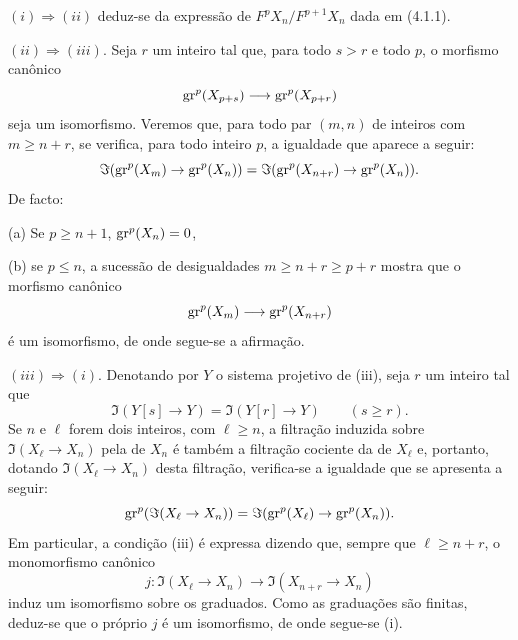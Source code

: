 \begin{prooftext}[Demonstração]
$(i)\Rightarrow(ii)$ deduz-se da expressão de $F^pX_n/F^{p+1}X_n$ dada em (4.1.1).

$(ii)\Rightarrow(iii)$. Seja $r$ um inteiro tal que, para todo $s>r$ e todo $p$, o morfismo canônico
\[
\operatorname{gr}^p(X_{p+s})\longrightarrow \operatorname{gr}^p(X_{p+r})
\]
seja um isomorfismo. Veremos que, para todo par $(m,n)$ de inteiros com $m\ge n+r$, se verifica, para todo inteiro $p$, a igualdade que aparece a seguir:
\[
\Im(\operatorname{gr}^p(X_m)\to\operatorname{gr}^p(X_n))=
\Im(\operatorname{gr}^p(X_{n+r})\to\operatorname{gr}^p(X_n)).
\]
De facto:

(a) Se $p\ge n+1$, $\operatorname{gr}^p(X_n)=0$,

(b) se $p\le n$, a sucessão de desigualdades $m\ge n+r\ge p+r$ mostra que o morfismo canônico
\[
\operatorname{gr}^p(X_m)\longrightarrow\operatorname{gr}^p(X_{n+r})
\]
é um isomorfismo, de onde segue-se a afirmação.

$(iii)\Rightarrow(i)$. Denotando por $Y$ o sistema projetivo de (iii), seja $r$ um inteiro tal que
\[
\Im(Y[s]\to Y)=\Im(Y[r]\to Y)\qquad(s\ge r).
\]
Se $n$ e $\ell$ forem dois inteiros, com $\ell\ge n$, a filtração induzida sobre $\Im(X_\ell\to X_n)$ pela de $X_n$ é também a filtração cociente da de $X_\ell$ e, portanto, dotando $\Im(X_\ell\to X_n)$ desta filtração, verifica-se a igualdade que se apresenta a seguir:
\[
\operatorname{gr}^p(\Im(X_\ell\to X_n))=
\Im(\operatorname{gr}^p(X_\ell)\to\operatorname{gr}^p(X_n)).
\]
Em particular, a condição (iii) é expressa dizendo que, sempre que $\ell\ge n+r$, o monomorfismo canônico
\[
j:\Im(X_\ell\to X_n)\longrightarrow\Im(X_{n+r}\to X_n)
\]
induz um isomorfismo sobre os graduados. Como as graduações são finitas, deduz-se que o próprio $j$ é um isomorfismo, de onde segue-se (i).
\end{prooftext}
